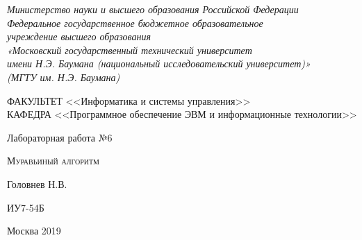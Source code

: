 \documentclass[a4paper,12pt]{article}
\begin{document}

\begin{titlepage}
\newpage

\begin{center}

\textit{Министерство науки и высшего образования Российской Федерации \\ 
Федеральное государственное бюджетное образовательное \\
учреждение высшего образования \\
«Московский государственный технический университет \\
имени Н.Э. Баумана (национальный исследовательский университет)» \\
(МГТУ им. Н.Э. Баумана) \\}
\hrulefill
\end{center}

\vspace{2em}

\begin{flushleft}
ФАКУЛЬТЕТ <<Информатика и системы управления>> \\
\vspace{0.5em}
КАФЕДРА <<Программное обеспечение ЭВМ и информационные технологии>>
\end{flushleft}


\vspace{8em}

\begin{center}
\LARGE Лабораторная работа №6 \\
\end{center}

\vspace{1.5em}

\begin{center}
\textsc{Муравьиный алгоритм}
\end{center}

\vspace{6em}

\begin{center}
Головнев Н.В.

\vspace{4em}

ИУ7-54Б
\end{center}

\vspace{\fill}

\begin{center}
Москва 2019
\end{center}

\end{titlepage}
\end{document}
